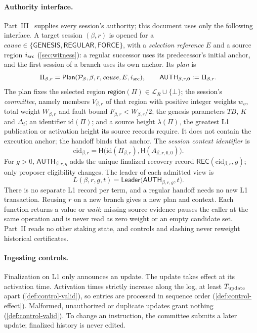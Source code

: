 \documentclass[11pt,a4paper]{article}
\newcommand{\Hash}{\mathsf H}
\newcommand{\TB}{\mathit{TB}}
\newcommand{\tagg}[1]{\ensuremath{\mathsf{#1}}}
\newcommand{\defterm}[1]{\textcolor{rrBlue}{\textit{#1}}}
\begin{document}
\paragraph{Authority interface.}
\label{sec:authority-context}
Part~III~\cite{part3} supplies every session's authority; this document
uses only the following interface. A target session $(\beta,r)$ is opened
for a $\mathit{cause}\in\{\tagg{GENESIS},\tagg{REGULAR},\tagg{FORCE}\}$,
with a \defterm{selection reference} $E$ and a source region
$i_{\rm src}$ (\cref{sec:witness}): a regular successor uses its
predecessor's initial anchor, and the first session of a branch uses its
own anchor. Its \defterm{plan} is
\[
 \Pi_{\beta,r}=\tagg{Plan}(\mathcal P_\beta,\beta,r,\mathit{cause},E,
 i_{\rm src}),\qquad \tagg{AUTH}_{\beta,r,0}:=\Pi_{\beta,r}.
\]
The plan fixes the selected region $\tagg{region}(\Pi)\in\mathcal L_R\cup
\{\bot\}$; the session's \defterm{committee}, namely members
$V_{\beta,r}$ of that region with positive integer weights $w_o$, total
weight $W_{\beta,r}$ and fault bound $F_{\beta,r}<W_{\beta,r}/2$; the
genesis parameters $\TB$, $K$ and $\Delta_i$; an identifier
$\mathrm{id}(\Pi)$; and a source height $\lambda(\Pi)$, the greatest L1
publication or activation height its source records require. It does not
contain the execution anchor; the handoff binds that anchor. The
\defterm{session context identifier} is
\[
 \mathrm{cid}_{\beta,r}=\Hash\bigl(\mathrm{id}(\Pi_{\beta,r}),
 \Hash(A_{\beta,r,0,0})\bigr).
\]
For $g>0$, $\tagg{AUTH}_{\beta,r,g}$ adds the unique finalized recovery
record $\tagg{REC}(\mathrm{cid}_{\beta,r},g)$; only proposer eligibility
changes. The leader of each admitted view is
\[
 L(\beta,r,g,t)=\tagg{Leader}\bigl(\tagg{AUTH}_{\beta,r,g},t\bigr).
\]
There is no separate L1 record per term, and a regular handoff needs no
new L1 transaction. Reusing $r$ on a new branch gives a new plan and
context. Each function returns a value or \emph{wait}: missing source
evidence pauses the caller at the same operation and is never read as
zero weight or an empty candidate set. Part~II reads no other staking
state, and controls and slashing never reweight historical certificates.

\paragraph{Ingesting controls.}
Finalization on L1 only announces an update. The update takes effect at
its activation time. Activation times strictly increase along the log,
at least $T_{\rm update}$ apart (\cref{def:control-valid}), so entries
are processed in sequence order (\cref{def:control-effect}). Malformed,
unauthorized or duplicate updates grant nothing
(\cref{def:control-valid}). To change an instruction, the committee
submits a later update; finalized history is never edited.
\end{document}
